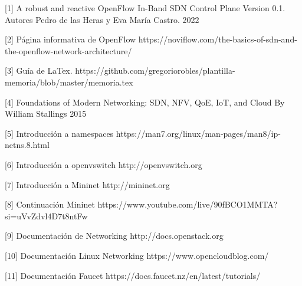 \documentclass[a4paper, 12pt]{book}
\begin{document}
	
	
	\cleardoublepage
	
	
	\cleardoublepage
	
	
	 
	
	[1]  A robust and reactive
	OpenFlow In-Band SDN Control Plane
	Version 0.1. Autores Pedro de las Heras y Eva María Castro. 2022
	
	[2]  Página informativa de OpenFlow https://noviflow.com/the-basics-of-sdn-and-the-openflow-network-architecture/ 
		
	[3]  Guía de LaTex.  https://github.com/gregoriorobles/plantilla-memoria/blob/master/memoria.tex
	
	[4]  Foundations of Modern Networking: SDN, NFV, QoE, IoT, and Cloud By William Stallings 2015
	
	[5]  Introducción a namespaces https://man7.org/linux/man-pages/man8/ip-netns.8.html
	
	[6]  Introducción a openvswitch http://openvswitch.org
	
	[7]  Introducción a Mininet http://mininet.org
	
	[8]  Continuación Mininet https://www.youtube.com/live/90fBCO1MMTA?si=uVvZdvl4D7t8ntFw
	
	[9]  Documentación de Networking http://docs.openstack.org
	
	[10] Documentación Linux Networking https://www.opencloudblog.com/
	
	[11] Documentación Faucet https://docs.faucet.nz/en/latest/tutorials/
 	
	
\end{document}
